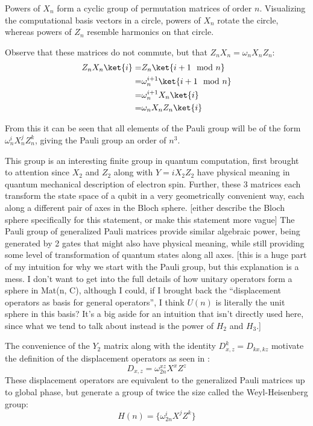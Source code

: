 Powers of $X_n$ form a cyclic group of permutation matrices of order $n$. Visualizing the computational basis vectors in a circle, powers of $X_n$ rotate the circle, whereas powers of $Z_n$ resemble harmonics on that circle.

Observe that these matrices do not commute, but that $Z_nX_n = \omega_nX_nZ_n$:
\begin{align*}
	Z_nX_n\ket{i}
	=& Z_n\ket{i+1\mod n}
	\\=& \omega_n^{i+1}\ket{i+1\mod n}
	\\=& \omega_n^{i+1}X_n\ket{i}
	\\=& \omega_nX_nZ_n\ket{i}
\end{align*}

From this it can be seen that all elements of the Pauli group will be of the form $\omega_n^iX_n^jZ_n^k$, giving the Pauli group an order of $n^3$.

This group is an interesting finite group in quantum computation, first brought to attention since $X_2$ and $Z_2$ along with $Y  = iX_2Z_2$ have physical meaning in quantum mechanical description of electron spin. Further, these 3 matrices each transform the state space of a qubit in a very geometrically convenient way, each along a different pair of axes in the Bloch sphere. [either describe the Bloch sphere specifically for this statement, or make this statement more vague] The Pauli group of generalized Pauli matrices provide similar algebraic power, being generated by 2 gates that might also have physical meaning, while still providing some level of transformation of quantum states along all axes.
[this is a huge part of my intuition for why we start with the Pauli group, but this explanation is a mess. I don't want to get into the full details of how unitary operators form a sphere in Mat(n, C), although I could, if I brought back the ``displacement operators as basis for general operators'', I think $U(n)$ is literally the unit sphere in this basis? It's a big aside for an intuition that isn't directly used here, since what we tend to talk about instead is the power of $H_2$ and $H_3$.]

The convenience of the $Y_2$ matrix along with the identity $D_{x, z}^k = D_{kx,kz}$ motivate the definition of the displacement operators as seen in \cite{pi-over-eight}:
\[D_{x, z} = \omega^{xz}_{2n}X^xZ^z\]
These displacement operators are equivalent to the generalized Pauli matrices up to global phase, but generate a group of twice the size called the Weyl-Heisenberg group:
\[H(n) = \{\omega_{2n}^iX^jZ^k\}\]

